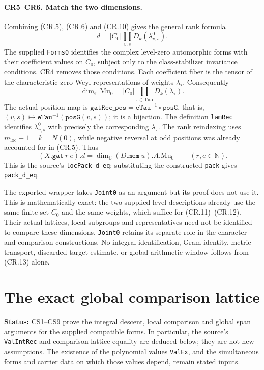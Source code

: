 \documentclass[11pt,a4paper]{article}
\numberwithin{equation}{section}
\theoremstyle{remark}\newtheorem{remark}[theorem]{Remark}
\newcommand{\status}[1]{\textbf{Status:} #1}
\begin{document}
\paragraph{CR5--CR6. Match the two dimensions.}
Combining (CR.5), (CR.6) and (CR.10) gives the general rank formula
\[
 \boxed{\ d=|C_0|\prod_{v,s}D_k(\lambda^0_{v,s}).\ }      \tag{CR.11}
\]
The supplied \texttt{Forms0} identifies the complex level-zero
automorphic forms with their coefficient values on $C_0$, subject
only to the class-stabilizer invariance conditions. CR4 removes
those conditions. Each coefficient fiber is the tensor of the
characteristic-zero Weyl representations of weights $\lambda_\tau$.
Consequently
\[
 \dim_{\mathbb C}\mathrm{Mu}_0
       =|C_0|\prod_{\tau\in\mathrm{Tau}}D_k(\lambda_\tau).
                                                               \tag{CR.12}
\]
The actual position map is
$\texttt{gatRec\_pos}=\texttt{eTau}^{-1}\circ\texttt{posG}$,
that is, $(v,s)\mapsto\texttt{eTau}^{-1}(\texttt{posG}(v,s))$;
it is a bijection. The definition \texttt{lamRec} identifies
$\lambda^0_{v,s}$ with precisely the corresponding $\lambda_\tau$.
The rank reindexing uses $m_{\mathrm{loc}}+1=k=N(0)$, while negative reversal at
odd positions was already accounted for in (CR.5). Thus
\[
 \boxed{\ (X.\texttt{gat}\ r\ e).d
          =\dim_{\mathbb C}(D.\texttt{mem}\ u).A.\mathrm{Mu}_0\ }
             \qquad(r,e\in\mathbb N).                    \tag{CR.13}
\]
This is the source's \texttt{locPack\_d\_eq}; substituting the
constructed \texttt{pack} gives \texttt{pack\_d\_eq}.

The exported wrapper takes \texttt{Joint0} as an argument but its
proof does not use it. This is mathematically exact: the two supplied
level descriptions already use the same finite set $C_0$ and the
same weights, which suffice for (CR.11)--(CR.12). Their actual
lattices, local subgroups and representatives need not be identified
to compare these dimensions. \texttt{Joint0} retains its separate
role in the character and comparison constructions. No integral
identification, Gram identity, metric transport, discarded-target
estimate, or global arithmetic window follows from (CR.13) alone.


\section{The exact global comparison lattice}
\label{sec:comparison-span}

\status{CS1--CS9 prove the integral descent, local comparison and
global span arguments for the supplied compatible forms. In particular,
the source's \texttt{ValIntRec} and comparison-lattice equality are
deduced below; they are not new assumptions. The existence of the
polynomial values \texttt{ValEx}, and the simultaneous forms and carrier
data on which those values depend, remain stated inputs.}
\end{document}
